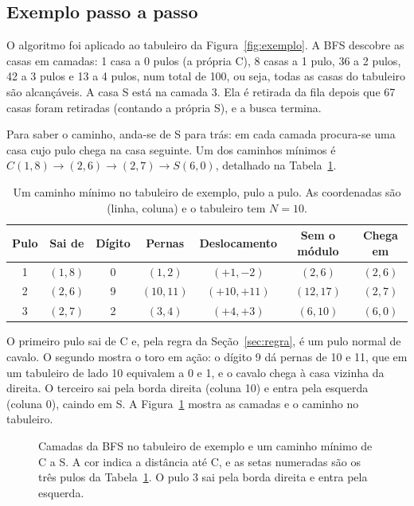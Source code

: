 \subsection{Exemplo passo a passo}
\label{sec:exemplo}

O algoritmo foi aplicado ao tabuleiro da Figura~\ref{fig:exemplo}. A BFS descobre as casas em
camadas: 1 casa a 0 pulos (a própria C), 8 casas a 1 pulo, 36 a 2 pulos, 42 a 3 pulos e 13 a
4 pulos, num total de 100, ou seja, todas as casas do tabuleiro são alcançáveis. A casa S
está na camada 3. Ela é retirada da fila depois que 67 casas foram retiradas (contando a
própria S), e a busca termina.

Para saber o caminho, anda-se de S para trás: em cada camada procura-se uma casa cujo pulo
chega na casa seguinte. Um dos caminhos mínimos é
$C(1, 8) \to (2, 6) \to (2, 7) \to S(6, 0)$, detalhado na Tabela~\ref{tab:trace}.

\begin{table}[ht]
  \centering
  \caption{Um caminho mínimo no tabuleiro de exemplo, pulo a pulo. As coordenadas são
  (linha, coluna) e o tabuleiro tem $N = 10$.}
  \label{tab:trace}
  \small
  \begin{tabular}{|c|c|c|c|c|c|c|}
    \hline
    \textbf{Pulo} & \textbf{Sai de} & \textbf{Dígito} & \textbf{Pernas} & \textbf{Deslocamento}
      & \textbf{Sem o módulo} & \textbf{Chega em}\\
    \hline
    1 & $(1, 8)$ & 0 & $(1, 2)$ & $(+1, -2)$ & $(2, 6)$ & $(2, 6)$\\
    \hline
    2 & $(2, 6)$ & 9 & $(10, 11)$ & $(+10, +11)$ & $(12, 17)$ & $(2, 7)$\\
    \hline
    3 & $(2, 7)$ & 2 & $(3, 4)$ & $(+4, +3)$ & $(6, 10)$ & $(6, 0)$\\
    \hline
  \end{tabular}
\end{table}

O primeiro pulo sai de C e, pela regra da Seção~\ref{sec:regra}, é um pulo normal de
cavalo. O segundo mostra o toro em ação: o dígito 9 dá pernas de 10 e 11, que em um tabuleiro
de lado 10 equivalem a 0 e 1, e o cavalo chega à casa vizinha da direita. O terceiro sai pela
borda direita (coluna 10) e entra pela esquerda (coluna 0), caindo em S. A
Figura~\ref{fig:camadas} mostra as camadas e o caminho no tabuleiro.

\begin{figure}[ht]
  \centering
  
  \caption{Camadas da BFS no tabuleiro de exemplo e um caminho mínimo de C a S. A cor indica a
  distância até C, e as setas numeradas são os três pulos da Tabela~\ref{tab:trace}. O pulo 3
  sai pela borda direita e entra pela esquerda.}
  \label{fig:camadas}
\end{figure}
